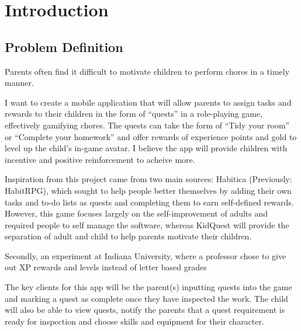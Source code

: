 
\chapter{Introduction}
\label{chap:intro}

\section{Problem Definition}
Parents often find it difficult to motivate children to perform chores in a timely manner.

I want to create a mobile application that will allow parents to assign tasks and rewards to their children in the form of ``quests'' in a role-playing game, effectively gamifying chores. 
The quests can take the form of “Tidy your room” or “Complete your homework” and offer rewards of experience points and gold to level up the child's in-game avatar. 
I believe the app will provide children with incentive and positive reinforcement to acheive more.

Inspiration from this project came from two main sources: Habitica (Previously: HabitRPG), which sought to help people better themselves by adding their own tasks and to-do lists as quests and completing them to earn self-defined rewards. 
However, this game focuses largely on the self-improvement of adults and required people to self manage the software, whereas KidQuest will provide the separation of adult and child to help parents motivate their children.

Secondly, an experiment at Indiana University, where a professor chose to give out XP rewards and levels instead of letter based grades \cite{sheldon2011multiplayer} 

The key clients for this app will be the parent(s) inputting quests into the game and marking a quest as complete once they have inspected the work. 
The child will also be able to view quests, notify the parents that a quest requirement is ready for inspection and choose skills and equipment for their character. 

